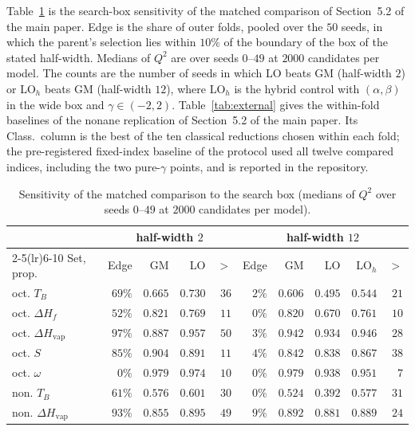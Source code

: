 \documentclass[a5paper, 10pt]{article}
\theoremstyle{plain}
\theoremstyle{remark}
\theoremstyle{definition}
\begin{document}
Table~\ref{tab:box} is the search-box sensitivity of the matched
comparison of Section~5.2 of the main paper. Edge is the share of outer
folds, pooled over the $50$ seeds, in which the parent's selection lies
within $10\%$ of the boundary of the box of the stated half-width.
Medians of $Q^2$ are over seeds $0$--$49$ at $2000$ candidates per
model. The counts are the number of seeds in which LO beats GM
(half-width $2$) or LO$_h$ beats GM (half-width $12$), where LO$_h$ is
the hybrid control with $(\alpha,\beta)$ in the wide box and
$\gamma \in (-2,2)$. Table~\ref{tab:external} gives the within-fold
baselines of the nonane replication of Section~5.2 of the main paper. Its
Class.\ column is the best of the ten classical reductions chosen within
each fold; the pre-registered fixed-index baseline of the protocol used
all twelve compared indices, including the two pure-$\gamma$ points,
and is reported in the repository.

\begin{table}[htbp]
\centering
\caption{Sensitivity of the matched comparison to the search box (medians of $Q^2$ over seeds $0$--$49$ at $2000$ candidates per model).}
\label{tab:box}
\small
\setlength{\tabcolsep}{1.6pt}
\begin{tabular}{lrrrrrrrrr}
\toprule
 & \multicolumn{4}{c}{half-width $2$} & \multicolumn{5}{c}{half-width $12$}\\
\cmidrule(lr){2-5}\cmidrule(lr){6-10}
Set, prop. & Edge & GM & LO & $>$ & Edge & GM & LO & LO$_h$ & $>$\\
\midrule
oct. $T_B$ & $69\%$ & $0.665$ & $0.730$ & $36$ & $2\%$ & $0.606$ & $0.495$ & $0.544$ & $21$\\
oct. $\Delta H_f$ & $52\%$ & $0.821$ & $0.769$ & $11$ & $0\%$ & $0.820$ & $0.670$ & $0.761$ & $10$\\
oct. $\Delta H_{\mathrm{vap}}$ & $97\%$ & $0.887$ & $0.957$ & $50$ & $3\%$ & $0.942$ & $0.934$ & $0.946$ & $28$\\
oct. $S$ & $85\%$ & $0.904$ & $0.891$ & $11$ & $4\%$ & $0.842$ & $0.838$ & $0.867$ & $38$\\
oct. $\omega$ & $0\%$ & $0.979$ & $0.974$ & $10$ & $0\%$ & $0.979$ & $0.938$ & $0.951$ & $7$\\
non. $T_B$ & $61\%$ & $0.576$ & $0.601$ & $30$ & $0\%$ & $0.524$ & $0.392$ & $0.577$ & $31$\\
non. $\Delta H_{\mathrm{vap}}$ & $93\%$ & $0.855$ & $0.895$ & $49$ & $9\%$ & $0.892$ & $0.881$ & $0.889$ & $24$\\
\bottomrule
\end{tabular}
\end{table}
\end{document}
